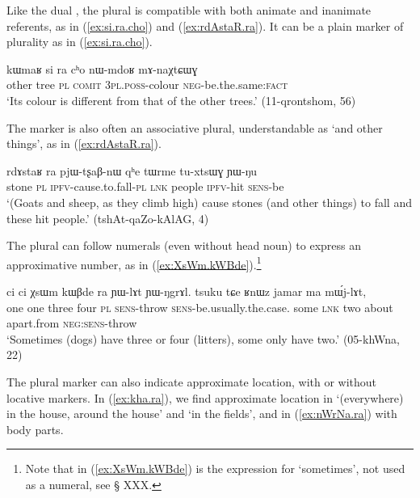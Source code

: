 Like the dual , the plural  is compatible with both animate and inanimate referents, as in (\ref{ex:si.ra.cho}) and (\ref{ex:rdAstaR.ra}). It can be a plain marker of plurality as in (\ref{ex:si.ra.cho}).

\begin{exe}
\ex \label{ex:si.ra.cho}
\gll kɯmaʁ si ra cʰo nɯ-mdoʁ mɤ-naχtɕɯɣ \\
other tree \textsc{pl} \textsc{comit} \textsc{3pl}.\textsc{poss}-colour \textsc{neg}-be.the.same:\textsc{fact} \\
\glt `Its colour is different from that of the other trees.' (11-qrontshom, 56)
\end{exe} 

The marker  is also often an associative plural, understandable as `and other things', as in (\ref{ex:rdAstaR.ra}).

\begin{exe}
\ex \label{ex:rdAstaR.ra}
\gll rdɤstaʁ ra pjɯ-tʂaβ-nɯ qʰe tɯrme tu-xtsɯɣ ɲɯ-ŋu \\
stone \textsc{pl} \textsc{ipfv}-cause.to.fall-\textsc{pl} \textsc{lnk} people \textsc{ipfv}-hit \textsc{sens}-be \\
\glt `(Goats and sheep, as they climb high) cause stones (and other things) to fall and these hit people.' (tshAt-qaZo-kAlAG, 4)
\end{exe} 

The plural can follow numerals (even without head noun) to express an approximative number, as in (\ref{ex:XsWm.kWBde}).\footnote{Note that in (\ref{ex:XsWm.kWBde})  is the expression for `sometimes', not used as a numeral, see § XXX.} 

\begin{exe}
\ex \label{ex:XsWm.kWBde}
\gll ci ci χsɯm kɯβde ra ɲɯ-lɤt ɲɯ-ŋgrɤl. tsuku tɕe ʁnɯz jamar ma mɯ́j-lɤt,\\
one one three four \textsc{pl} \textsc{sens}-throw \textsc{sens}-be.usually.the.case. some \textsc{lnk} two about apart.from \textsc{neg}:\textsc{sens}-throw \\
\glt  `Sometimes (dogs) have three or four (litters), some only have two.' (05-khWna, 22)
\end{exe} 

The plural marker  can also indicate approximate location, with or without locative markers. In (\ref{ex:kha.ra}), we find approximate location  in  `(everywhere) in the house, around the house' and  `in the fields', and in (\ref{ex:nWrNa.ra}) with body parts.

